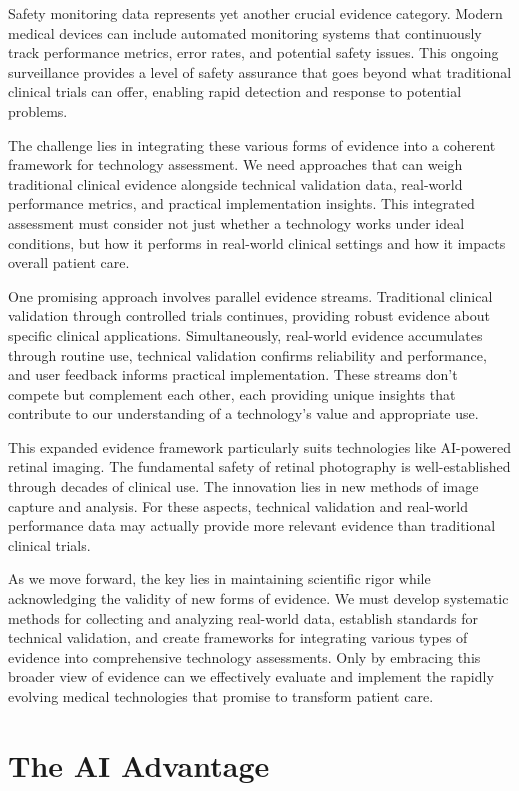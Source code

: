 \documentclass[
  Letterpaper,
]{scrbook}
\begin{document}
Safety monitoring data represents yet another crucial evidence category.
Modern medical devices can include automated monitoring systems that
continuously track performance metrics, error rates, and potential
safety issues. This ongoing surveillance provides a level of safety
assurance that goes beyond what traditional clinical trials can offer,
enabling rapid detection and response to potential problems.

The challenge lies in integrating these various forms of evidence into a
coherent framework for technology assessment. We need approaches that
can weigh traditional clinical evidence alongside technical validation
data, real-world performance metrics, and practical implementation
insights. This integrated assessment must consider not just whether a
technology works under ideal conditions, but how it performs in
real-world clinical settings and how it impacts overall patient care.

One promising approach involves parallel evidence streams. Traditional
clinical validation through controlled trials continues, providing
robust evidence about specific clinical applications. Simultaneously,
real-world evidence accumulates through routine use, technical
validation confirms reliability and performance, and user feedback
informs practical implementation. These streams don't compete but
complement each other, each providing unique insights that contribute to
our understanding of a technology's value and appropriate use.

This expanded evidence framework particularly suits technologies like
AI-powered retinal imaging. The fundamental safety of retinal
photography is well-established through decades of clinical use. The
innovation lies in new methods of image capture and analysis. For these
aspects, technical validation and real-world performance data may
actually provide more relevant evidence than traditional clinical
trials.

As we move forward, the key lies in maintaining scientific rigor while
acknowledging the validity of new forms of evidence. We must develop
systematic methods for collecting and analyzing real-world data,
establish standards for technical validation, and create frameworks for
integrating various types of evidence into comprehensive technology
assessments. Only by embracing this broader view of evidence can we
effectively evaluate and implement the rapidly evolving medical
technologies that promise to transform patient care.

\section{The AI Advantage}\label{the-ai-advantage}
\end{document}
